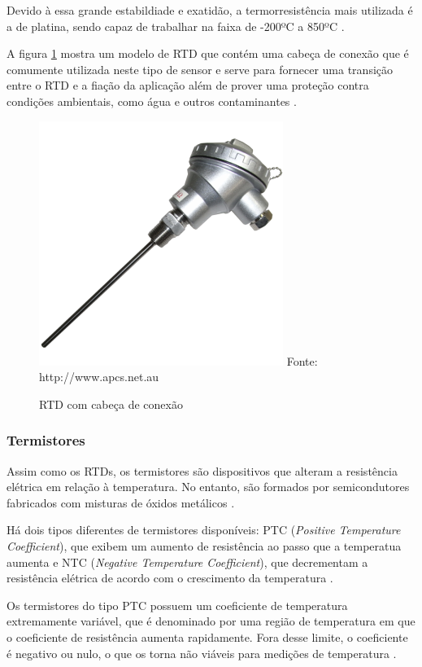 Devido à essa grande estabildiade e exatidão, a termorresistência mais utilizada é a de platina, sendo capaz de
trabalhar na faixa de -200ºC a 850ºC \cite{thomazini_albuquerque2005}.

A figura \ref{figura:rtd} mostra um modelo de RTD que contém uma cabeça de conexão que é comumente utilizada
neste tipo de sensor e serve para fornecer uma transição entre o RTD e a fiação da aplicação além de prover
uma proteção contra condições ambientais, como água e outros contaminantes \cite{burns2014}.

\begin{figure}[h]
	\caption{RTD com cabeça de conexão}
	\centering
	\includegraphics[scale=1.8]{../images/rtd.png}
	\hspace{\linewidth}
	Fonte: http://www.apcs.net.au
	\label{figura:rtd}
\end{figure}

\subsubsection{Termistores}
Assim como os RTDs, os termistores são dispositivos que alteram a resistência elétrica em relação à
temperatura. No entanto, são formados por semicondutores fabricados com misturas de óxidos metálicos
\cite{white_sapoff2014}.

Há dois tipos diferentes de termistores disponíveis: PTC (\textit{Positive Temperature Coefficient}), que
exibem um aumento de resistência ao passo que a temperatua aumenta e NTC (\textit{Negative Temperature
Coefficient}), que decrementam a resistência elétrica de acordo com o crescimento da temperatura
\cite{fontes2005}.

Os termistores do tipo PTC possuem um coeficiente de temperatura extremamente variável, que é denominado por
uma região de temperatura em que o coeficiente de resistência aumenta rapidamente. Fora desse limite, o
coeficiente é negativo ou nulo, o que os torna não viáveis para medições de temperatura
\cite{white_sapoff2014,thomazini_albuquerque2005}.

